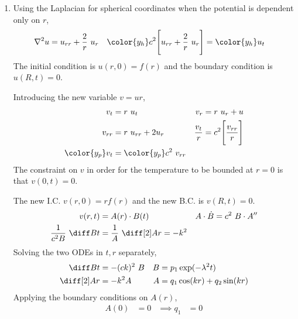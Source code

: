 \begin{enumerate}
    \item Using the Laplacian for spherical coordinates when the potential is dependent
          only on $ r $,
          \begin{align}
              \nabla^2 u                & = u_{rr} + \frac{2}{r}\ u_r &
              \color{y_h}c^2 \Bigg[ u_{rr}
              + \frac{2}{r}\ u_r \Bigg] & = \color{y_h}u_t
          \end{align}
          The initial condition is $ u(r, 0) = f(r) $ and the boundary condition is
          $ u(R, t) = 0 $. \par
          Introducing the new variable $ v = ur $,
          \begin{align}
              v_t            & = r\ u_t                             &
              v_r            & = r\ u_r + u                           \\
              v_{rr}         & = r\ u_{rr} + 2u_r                   &
              \frac{v_t}{r}  & = c^2 \Bigg[ \frac{v_{rr}}{r} \Bigg]   \\
              \color{y_p}v_t & = \color{y_p}c^2\ v_{rr}
          \end{align}
          The constraint on $ v $ in order for the temperature to be bounded at $ r = 0 $
          is that $ v(0, t) = 0 $. \par
          The new I.C. $ v(r, 0) = rf(r) $ and the new B.C. is $ v(R, t) = 0 $.
          \begin{align}
              v(r, t)                  & = A(r) \cdot B(t)                 &
              A \cdot \dot{B}          & = c^2\ B \cdot A''                  \\
              \frac{1}{c^2B}\ \diff Bt & = \frac{1}{A}\ \diff[2] Ar = -k^2   \\
          \end{align}
          Solving the two ODEs in $ t, r $ separately,
          \begin{align}
              \diff Bt    & = -(ck)^2\ B                  &
              B           & = p_1 \exp(-\lambda^2 t)        \\
              \diff[2] Ar & = -k^2A                       &
              A           & = q_1 \cos(kr) + q_2 \sin(kr)
          \end{align}
          Applying the boundary conditions on $ A(r) $,
          \begin{align}
              A(0)              & = 0                           &
              \implies q_1      & = 0                             \\

\end{align}
\end{enumerate}
